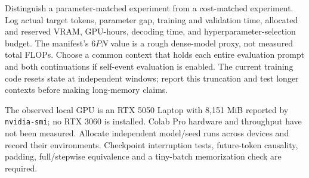 Distinguish a parameter-matched experiment from a cost-matched experiment.
Log actual target tokens, parameter gap, training and validation time, allocated
and reserved VRAM, GPU-hours, decoding time, and hyperparameter-selection budget.
The manifest's \(6PN\) value is a rough dense-model proxy, not measured total FLOPs.
Choose a common context that holds each entire evaluation prompt and both
continuations if self-event evaluation is enabled. The current training code resets
state at independent windows; report this truncation and test longer contexts
before making long-memory claims.

The observed local GPU is an RTX 5050 Laptop with 8,151 MiB reported by
\texttt{nvidia-smi}; no RTX 3060 is installed. Colab Pro hardware and throughput
have not been measured. Allocate independent model/seed runs across devices and
record their environments. Checkpoint interruption tests, future-token causality,
padding, full/stepwise equivalence and a tiny-batch memorization check are required.
